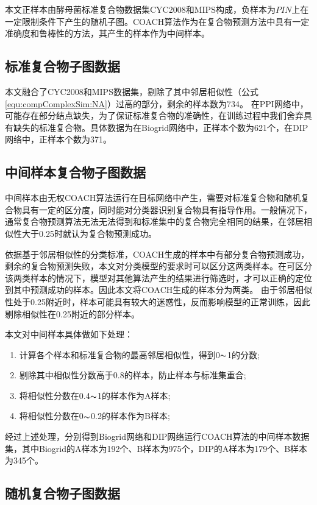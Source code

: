 本文正样本由酵母菌标准复合物数据集CYC2008\cite{pu_up--date_2009}和MIPS\cite{pagel_mips_2005}构成，负样本为$PIN$上在一定限制条件下产生的随机子图。COACH算法\cite{leung_predicting_2009}作为在复合物预测方法中具有一定准确度和鲁棒性的方法，其产生的样本作为中间样本。

\subsection{标准复合物子图数据}
\label{subsection:standardComplex}
本文融合了CYC2008和MIPS数据集，剔除了其中邻居相似性（公式\ref{equ:compComplexSim:NA}）过高的部分，剩余的样本数为734。
在PPI网络中，可能存在部分结点缺失，为了保证标准复合物的准确性，在训练过程中我们舍弃具有缺失的标准复合物。具体数据为在Biogrid网络中，正样本个数为621个，在DIP网络中，正样本个数为371。
\subsection{中间样本复合物子图数据}
\label{subsection:middleComplex}
中间样本由无权COACH算法运行在目标网络中产生，需要对标准复合物和随机复合物具有一定的区分度，同时能对分类器识别复合物具有指导作用。一般情况下，通常复合物预测算法无法无法得到和标准集中的复合物完全相同的结果，在邻居相似性大于0.25时就认为复合物预测成功。

依据基于邻居相似性的分类标准，COACH生成的样本中有部分复合物预测成功，剩余的复合物预测失败，本文对分类模型的要求时可以区分这两类样本。在可区分该两类样本的情况下，模型对其他算法产生的结果进行筛选时，才可以正确的定位到其中预测成功的样本。因此本文将COACH生成的样本分为两类。
由于邻居相似性处于0.25附近时，样本可能具有较大的迷惑性，反而影响模型的正常训练，因此剔除相似性在0.25附近的部分样本。

本文对中间样本具体做如下处理：
\begin{enumerate}
    \item 计算各个样本和标准复合物的最高邻居相似性，得到0$\thicksim$1的分数;
    \item 剔除其中相似性分数高于0.8的样本，防止样本与标准集重合;
    \item 将相似性分数在0.4$\thicksim$1的样本作为A样本;
    \item 将相似性分数在0$\thicksim$0.2的样本作为B样本;
\end{enumerate}

经过上述处理，分别得到Biogrid网络和DIP网络运行COACH算法的中间样本数据集，其中Biogrid的A样本为192个、B样本为975个，DIP的A样本为179个、B样本为345个。
\subsection{随机复合物子图数据}
\label{subsection:randomComplex}

